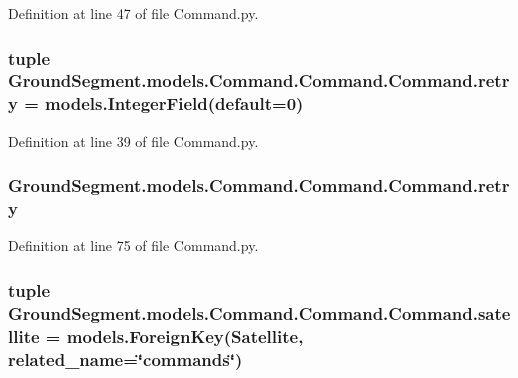 Definition at line 47 of file Command.\+py.

\hypertarget{class_ground_segment_1_1models_1_1_command_1_1_command_1_1_command_acc47affcbcab8cc9f63467b9db085d9b}{}
\subsubsection[{retry}]{\setlength{\rightskip}{0pt plus 5cm}tuple Ground\+Segment.\+models.\+Command.\+Command.\+Command.\+retry = models.\+Integer\+Field(default=0)\hspace{0.3cm}{\ttfamily [static]}}\label{class_ground_segment_1_1models_1_1_command_1_1_command_1_1_command_acc47affcbcab8cc9f63467b9db085d9b}


Definition at line 39 of file Command.\+py.

\hypertarget{class_ground_segment_1_1models_1_1_command_1_1_command_1_1_command_a243562f6a594c1010710fdd675786e03}{}
\subsubsection[{retry}]{\setlength{\rightskip}{0pt plus 5cm}Ground\+Segment.\+models.\+Command.\+Command.\+Command.\+retry}\label{class_ground_segment_1_1models_1_1_command_1_1_command_1_1_command_a243562f6a594c1010710fdd675786e03}


Definition at line 75 of file Command.\+py.

\hypertarget{class_ground_segment_1_1models_1_1_command_1_1_command_1_1_command_aa4b99f369d0e6f9d701875f9bd16d238}{}
\subsubsection[{satellite}]{\setlength{\rightskip}{0pt plus 5cm}tuple Ground\+Segment.\+models.\+Command.\+Command.\+Command.\+satellite = models.\+Foreign\+Key({\bf Satellite}, related\+\_\+name=\char`\"{}commands\char`\"{})\hspace{0.3cm}{\ttfamily [static]}}\label{class_ground_segment_1_1models_1_1_command_1_1_command_1_1_command_aa4b99f369d0e6f9d701875f9bd16d238}



